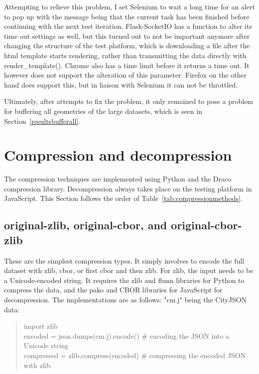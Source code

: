 Attempting to relieve this problem, I set Selenium to wait a long time for an alert to pop up with the message being that the current task has been finished before continuing with the next test iteration.
Flask-SocketIO has a function to alter its time out settings as well, but this turned out to not be important anymore after changing the structure of the test platform, which is downloading a file after the html template starts rendering, rather than transmitting the data directly with render\_template().
Chrome also has a time limit before it returns a time out.
It however does not support the alteration of this parameter.
Firefox on the other hand does support this, but in liaison with Selenium it can not be throttled.

Ultimately, after attempts to fix the problem, it only remained to pose a problem for buffering all geometries of the large datasets, which is seen in Section~\ref{resultsbufferall}.




\section{Compression and decompression}
\label{sec:compressiondecompression}
The compression techniques are implemented using Python and the Draco compression library.
Decompression always takes place on the testing platform in JavaScript.
This Section follows the order of Table~\ref{tab:compressionmethods}.

\subsection{original-zlib, original-cbor, and original-cbor-zlib}
\label{sec:gzipcborcombo}

These are the simplest compression types.
It simply involves to encode the full dataset with zlib, cbor, or first cbor and then zlib.
For zlib, the input needs to be a Unicode-encoded string.
It requires the zlib and flunn libraries for Python to compress the data, and the pako and CBOR libraries for JavaScript for decompression.
The implementations are as follows: "cm.j" being the CityJSON data:

\blockquote{import zlib\\
encoded = json.dumps(cm.j).encode()    \# encoding the JSON into a Unicode string\\
compressed = zlib.compress(encoded)    \# compressing the encoded JSON with zlib}

